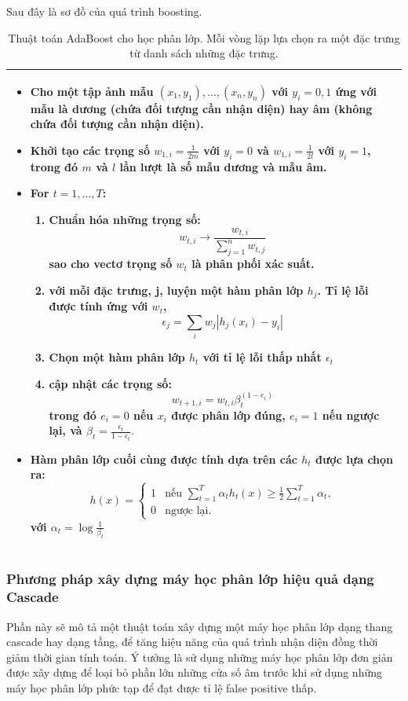 \documentclass[14pt, oneside, a4paper, openany]{scrartcl}
\begin{document}
Sau đây là sơ đồ của quá trình boosting.
\begin{table}[!h]
\begin{tabular}{ |m{15cm}| } 
	\hline
	\begin{itemize}
		\item Cho một tập ảnh mẫu $(x_1,y_1),...,(x_n,y_n)$ với $y_i=0,1$ ứng với mẫu là dương (chứa đối tượng cần nhận diện) hay âm (không chứa đối tượng cần nhận diện).
		\item Khởi tạo các trọng số $w_{1,i}= \frac{1}{2m}$ với $y_i=0$ và $w_{1,i}= \frac{1}{2l}$ với $y_i=1$, trong đó $m$ và $l$ lần lượt là số mẫu dương và mẫu âm.
		\item For $t = 1,...,T$:
		\begin{enumerate}
			\item Chuẩn hóa những trọng số:
			$$
			w_{t,i} \rightarrow \frac{w_{t,i}}{\sum_{j=1}^{n}w_{t,j}}
			$$
			sao cho  vectơ trọng số $w_t$ là phân phối xác suất.
			\item với mỗi đặc trưng, j, luyện một hàm phân lớp $h_j$. Tỉ lệ lỗi được tính ứng với $w_t$,
			$$
			\epsilon_j = \sum_i w_j|h_j(x_i) - y_i|
			$$
			\item Chọn một hàm phân lớp $h_t$ với tỉ lệ lỗi thấp nhất $\epsilon_t$
			\item cập nhật các trọng số:
			$$
			w_{t+1,i} = w_{t,i} \beta_t^{(1-e_i)}
			$$
			trong đó $e_i=0$ nếu $x_i$ được phân lớp đúng, $e_i=1$ nếu ngược lại, và $\beta_t = \frac{\epsilon_t}{1 - \epsilon_t}.$
		\end{enumerate}
		\item Hàm phân lớp cuối cùng được tính dựa trên các $h_t$ được lựa chọn ra:
		$$
		h(x)=
		\begin{cases}
			1& \text{nếu $\sum_{t=1}^{T}\alpha_t h_t(x) \geq \frac{1}{2}\sum_{t=1}^{T}\alpha_t$},\\
			0& \text{ngược lại}.
		\end{cases}
		$$
		với $\alpha_t = \log\frac{1}{\beta_t}$
	\end{itemize}
	\\
	\hline
\end{tabular}
\caption[Thuật toán AdaBoost cho học phân lớp]{Thuật toán AdaBoost cho học phân lớp. Mỗi vòng lặp lựa chọn ra một đặc trưng từ danh sách những đặc trưng.}
\end{table}
\subsubsection{Phương pháp xây dựng máy học phân lớp hiệu quả dạng Cascade}
Phần này sẽ mô tả một thuật toán xây dựng một máy học phân lớp dạng thang cascade hay dạng tầng, để tăng hiệu năng của quá trình nhận diện đồng thời giảm thời gian tính toán.
Ý tưởng là sử dụng những máy học phân lớp đơn giản được xây dựng để loại bỏ phần lớn những cửa số âm trước khi sử dụng những máy học phân lớp phức tạp để đạt được tỉ lệ false positive thấp.
\end{document}
